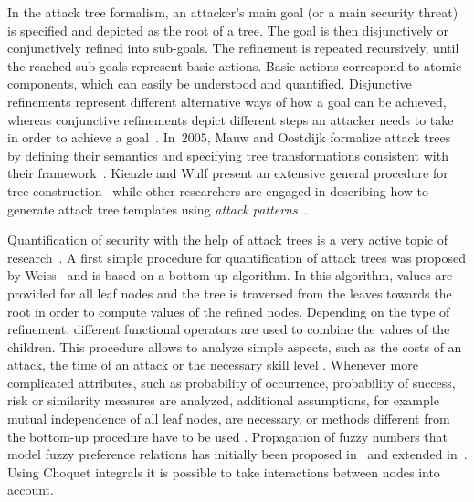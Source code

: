 \documentclass[a4paper]{article}
\begin{document}
In the attack tree formalism, an attacker's main goal (or a main security
threat) is specified and depicted as the root of a tree. The goal is then
disjunctively or conjunctively refined into sub-goals. The refinement is 
repeated recursively, until the reached sub-goals represent basic  actions.
Basic actions correspond to atomic components, which can  easily be understood
and quantified. Disjunctive refinements represent  different alternative ways of
how a goal can be achieved, whereas conjunctive refinements depict different
steps an attacker needs to take in order to achieve a goal~\cite{QiLe}.
In~$2005$, Mauw and Oostdijk formalize attack trees  by defining their semantics
and specifying tree transformations consistent with  their
framework~\cite{MaOo}. Kienzle and Wulf present an extensive general procedure
for tree construction~\cite{KiWu} while other researchers are engaged  in
describing how to generate attack tree templates using \emph{attack 
patterns}~\cite{MoElLi,LiMo}.

Quantification of security with the help of attack trees is a very active
topic of research~\cite{WhPhWaPa}. A first simple procedure for quantification
of attack trees was proposed by Weiss~\cite{Weis} and is based on a bottom-up
algorithm. In this algorithm, values are provided for all leaf nodes and the
tree is traversed from the leaves towards the root
in order to compute values of the refined nodes.  
Depending on the type of
refinement, different functional operators are used to combine the values of
the children. This procedure allows to analyze simple aspects, such as the 
costs of an attack, the time of an attack or the necessary skill level
\cite{Weis,Amor,SaSaScWa,Schn,ByFrMi,HiUnJaSaLu,FuChWaLeTaAnLi,MaOo,BiDaPe,Yage,EdDaRaMi,SaDuPa,HeApFuRoRuWe,LiLiFeHe,AbCeKa,BaPe,TaJo,WhPhWaPa}.
Whenever more complicated attributes, such as probability of occurrence, 
probability of success, risk or similarity measures are analyzed, additional 
assumptions, for example mutual independence of all leaf nodes, are
necessary, or methods different from the bottom-up 
procedure have to be used
\cite{Schn,ByFrMi,BuLaPrSaWi,EdDaRaMi,Yage,JuWi3,HeApFuRoRuWe,LiLiFeHe,Buon2,AbCeKa,BuFeMe,OnTuThNaSzMa,BuFeMe2,MaThFe,WaWhPhPa,ReSeKoStHo,RoKiTr2,ZhYu}.
Propagation of fuzzy numbers that model fuzzy preference relations has 
initially been proposed in~\cite{BoFeGi} and extended in~\cite{BuFe}. Using 
Choquet integrals it is possible to take interactions between nodes into 
account.
\end{document}
